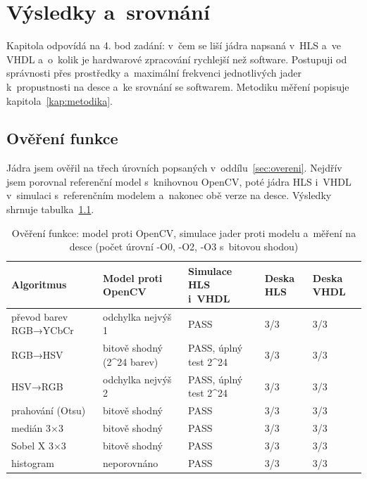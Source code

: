 

\chapter{Výsledky a~srovnání}
\label{kap:vysledky}

Kapitola odpovídá na 4. bod zadání: v~čem se liší jádra napsaná v~HLS a~ve VHDL a~o~kolik je hardwarové zpracování rychlejší než software. Postupuji od správnosti přes prostředky a~maximální frekvenci jednotlivých jader k~propustnosti na desce a~ke srovnání se softwarem. Metodiku měření popisuje kapitola~\ref{kap:metodika}.

\section{Ověření funkce}
\label{sec:vfunkce}

Jádra jsem ověřil na třech úrovních popsaných v~oddílu~\ref{sec:overeni}. Nejdřív jsem porovnal referenční model s~knihovnou OpenCV, poté jádra HLS i~VHDL v~simulaci s~referenčním modelem a~nakonec obě verze na desce. Výsledky shrnuje tabulka~\ref{tab:overeni}.


\begin{table}[htbp]
    \centering
    \caption{Ověření funkce: model proti OpenCV, simulace jader proti modelu a~měření na desce (počet úrovní -O0, -O2, -O3 s~bitovou shodou)}
    \label{tab:overeni}
    \begin{tabular}{p{3.4cm}p{3.6cm}p{3.2cm}p{1.7cm}p{1.7cm}}
        \toprule
        Algoritmus & Model proti OpenCV & Simulace HLS i~VHDL & Deska HLS & Deska VHDL \\
        \midrule
        převod barev RGB→YCbCr & odchylka nejvýš 1 & PASS & 3/3 & 3/3 \\
        RGB→HSV & bitově shodný (2^24 barev) & PASS, úplný test 2^24 & 3/3 & 3/3 \\
        HSV→RGB & odchylka nejvýš 2 & PASS, úplný test 2^24 & 3/3 & 3/3 \\
        prahování (Otsu) & bitově shodný & PASS & 3/3 & 3/3 \\
        medián 3×3 & bitově shodný & PASS & 3/3 & 3/3 \\
        Sobel X 3×3 & bitově shodný & PASS & 3/3 & 3/3 \\
        histogram & neporovnáno & PASS & 3/3 & 3/3 \\
        \bottomrule
    \end{tabular}
\end{table}

